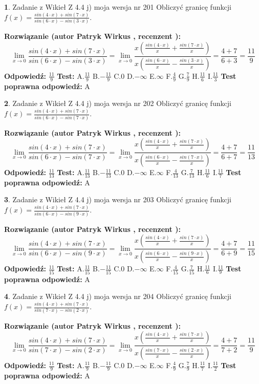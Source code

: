 \documentclass[12pt, a4paper]{article}
\theoremstyle{definition} %
\newtheorem{zad}{}
\newcommand{\zadStart}[1]{\begin{zad}#1\newline}
\newcommand{\zadStop}{\end{zad}}
\newcommand{\rozwStart}[2]{\noindent \textbf{Rozwiązanie (autor #1 , recenzent #2): }\newline}
\newcommand{\rozwStop}{\newline}
\newcommand{\odpStart}{\noindent \textbf{Odpowiedź:}\newline}
\newcommand{\odpStop}{\newline}
\newcommand{\testStart}{\noindent \textbf{Test:}\newline}
\newcommand{\testStop}{\newline}
\newcommand{\kluczStart}{\noindent \textbf{Test poprawna odpowiedź:}\newline}
\newcommand{\kluczStop}{\newline}
\begin{document}
\zadStart{Zadanie z Wikieł Z 4.4 j) moja wersja nr 201}
Obliczyć granicę funkcji $f(x)=\frac{sin(4\cdot x) +sin(7\cdot x)}{sin(6\cdot x) -sin(3\cdot x)}$.
\zadStop
\rozwStart{Patryk Wirkus}{}
$$\lim\limits_{x\to 0}\frac{sin(4\cdot x) +sin(7\cdot x)}{sin(6\cdot x) -sin(3\cdot x)}=\lim\limits_{x\to 0}\frac{x(\frac{sin(4\cdot x)}{x}+\frac{sin(7\cdot x)}{x})}{x(\frac{sin(6\cdot x)}{x}-\frac{sin(3\cdot x)}{x})}=\frac{4+7}{6+3} = \frac{11}{9}$$
\rozwStop
\odpStart
$\frac{11}{9}$
\odpStop
\testStart
A.$\frac{11}{9}$
B.$-\frac{11}{9}$
C.$0$
D.$-\infty$
E.$\infty$
F.$\frac{4}{9}$
G.$\frac{7}{9}$
H.$\frac{11}{6}$
I.$\frac{11}{3}$
\testStop
\kluczStart
A
\kluczStop



\zadStart{Zadanie z Wikieł Z 4.4 j) moja wersja nr 202}
Obliczyć granicę funkcji $f(x)=\frac{sin(4\cdot x) +sin(7\cdot x)}{sin(6\cdot x) -sin(7\cdot x)}$.
\zadStop
\rozwStart{Patryk Wirkus}{}
$$\lim\limits_{x\to 0}\frac{sin(4\cdot x) +sin(7\cdot x)}{sin(6\cdot x) -sin(7\cdot x)}=\lim\limits_{x\to 0}\frac{x(\frac{sin(4\cdot x)}{x}+\frac{sin(7\cdot x)}{x})}{x(\frac{sin(6\cdot x)}{x}-\frac{sin(7\cdot x)}{x})}=\frac{4+7}{6+7} = \frac{11}{13}$$
\rozwStop
\odpStart
$\frac{11}{13}$
\odpStop
\testStart
A.$\frac{11}{13}$
B.$-\frac{11}{13}$
C.$0$
D.$-\infty$
E.$\infty$
F.$\frac{4}{13}$
G.$\frac{7}{13}$
H.$\frac{11}{6}$
I.$\frac{11}{7}$
\testStop
\kluczStart
A
\kluczStop



\zadStart{Zadanie z Wikieł Z 4.4 j) moja wersja nr 203}
Obliczyć granicę funkcji $f(x)=\frac{sin(4\cdot x) +sin(7\cdot x)}{sin(6\cdot x) -sin(9\cdot x)}$.
\zadStop
\rozwStart{Patryk Wirkus}{}
$$\lim\limits_{x\to 0}\frac{sin(4\cdot x) +sin(7\cdot x)}{sin(6\cdot x) -sin(9\cdot x)}=\lim\limits_{x\to 0}\frac{x(\frac{sin(4\cdot x)}{x}+\frac{sin(7\cdot x)}{x})}{x(\frac{sin(6\cdot x)}{x}-\frac{sin(9\cdot x)}{x})}=\frac{4+7}{6+9} = \frac{11}{15}$$
\rozwStop
\odpStart
$\frac{11}{15}$
\odpStop
\testStart
A.$\frac{11}{15}$
B.$-\frac{11}{15}$
C.$0$
D.$-\infty$
E.$\infty$
F.$\frac{4}{15}$
G.$\frac{7}{15}$
H.$\frac{11}{6}$
I.$\frac{11}{9}$
\testStop
\kluczStart
A
\kluczStop



\zadStart{Zadanie z Wikieł Z 4.4 j) moja wersja nr 204}
Obliczyć granicę funkcji $f(x)=\frac{sin(4\cdot x) +sin(7\cdot x)}{sin(7\cdot x) -sin(2\cdot x)}$.
\zadStop
\rozwStart{Patryk Wirkus}{}
$$\lim\limits_{x\to 0}\frac{sin(4\cdot x) +sin(7\cdot x)}{sin(7\cdot x) -sin(2\cdot x)}=\lim\limits_{x\to 0}\frac{x(\frac{sin(4\cdot x)}{x}+\frac{sin(7\cdot x)}{x})}{x(\frac{sin(7\cdot x)}{x}-\frac{sin(2\cdot x)}{x})}=\frac{4+7}{7+2} = \frac{11}{9}$$
\rozwStop
\odpStart
$\frac{11}{9}$
\odpStop
\testStart
A.$\frac{11}{9}$
B.$-\frac{11}{9}$
C.$0$
D.$-\infty$
E.$\infty$
F.$\frac{4}{9}$
G.$\frac{7}{9}$
H.$\frac{11}{7}$
I.$\frac{11}{2}$
\testStop
\kluczStart
A
\kluczStop
\end{document}
